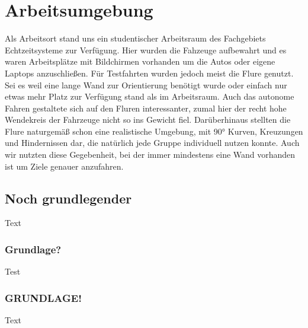 \section{Arbeitsumgebung}
\label{sec:arbeitsumgebung}
Als Arbeitsort stand uns ein studentischer Arbeitsraum des Fachgebiets Echtzeitsysteme zur Verfügung. Hier wurden die Fahzeuge aufbewahrt und es waren Arbeitsplätze mit Bildchirmen vorhanden um die Autos oder eigene Laptops anzuschließen. 
Für Testfahrten wurden jedoch meist die Flure genutzt. Sei es weil eine lange Wand zur Orientierung benötigt wurde oder einfach nur etwas mehr Platz zur Verfügung stand als im Arbeitsraum. Auch das autonome Fahren gestaltete sich auf den Fluren interessanter, zumal hier der recht hohe Wendekreis der Fahrzeuge nicht so ins Gewicht fiel. Darüberhinaus stellten die Flure naturgemäß schon eine realistische Umgebung, mit 90° Kurven, Kreuzungen und Hindernissen dar, die natürlich jede Gruppe individuell nutzen konnte. Auch wir nutzten diese Gegebenheit, bei der immer mindestens eine Wand vorhanden ist um Ziele genauer anzufahren.

\subsection{Noch grundlegender}
Text

\subsubsection{Grundlage?}
Test

\subsubsection{GRUNDLAGE!}
Text